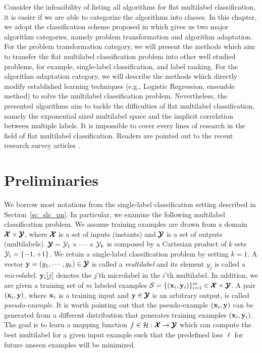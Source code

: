 {Consider the infeasibility of listing all algorithms for flat multilabel classification, it is easier if we are able to categorize the algorithms into classes.
In this chapter, we adopt the classification scheme proposed in \citep{Tsoumakas07multi,Tsoumakas10mining} which gives us two major algorithm categories, namely problem transformation and algorithm adaptation.
For the problem transformation category, we will present the methods which aim to transfer the flat multilabel classification problem into other well studied problems, for example, single-label classification, and label ranking.
For the algorithm adaptation category, we will describe the methods which directly modify established learning techniques (e.g., Logistic Regression, ensemble method) to solve the multilabel classification problem.
Nevertheless, the presented algorithms aim to tackle the difficulties of flat multilabel classification, namely the exponential sized multilabel space and the implicit correlation between multiple labels.
It is impossible to cover every lines of research in the field of flat multilabel classification.
Readers are pointed out to the recent research survey articles \citep{Tsoumakas07multi,Tsoumakas10mining,Zhang14a}.



\section{Preliminaries} \label{sc_mlc_pn}

We borrow most notations from the single-label classification setting described in Section~\ref{sc_slc_pn}.
In particular, we examine the following {multilabel classification} problem.
We assume training examples are drawn from a domain $\pmb {\mathcal{X}}\times\pmb {\mathcal{Y}}$, where $\pmb {\mathcal{X}}$ is a set of inputs (instants) and $\pmb {\mathcal{Y}}$ is a set of outputs (multilabels).
$\pmb {\mathcal{Y}} = \mathcal{Y}_1\times\cdots\times\mathcal{Y}_k$ is composed by a Cartesian product of $k$ sets $\mathcal{Y}_i=\{-1,+1\}$.
We retain a single-label classification problem by setting $k=1$.
A vector $\mathbf {y}=(y_1,\cdots,y_k)\in\pmb {\mathcal{Y}}$ is called a \textit{multilabel} and its element $y_j$ is called a \textit{microlabel}.
$\mathbf {y}_i[j]$ denotes the $j$'th microlabel in the $i$'th multilabel.
In addition, we are given a training set of $m$ labeled examples $\mathcal{S}=\{(\mathbf {x}_i,\mathbf {y}_i)\}_{i=1}^{m}\in\pmb {\mathcal{X}}\times\pmb {\mathcal{Y}}$. 
A pair $(\mathbf {x}_i,\mathbf {y})$, where $\mathbf {x}_i$ is a training input and $\mathbf {y}\in\pmb {\mathcal{Y}}$ is an arbitrary output, is called \textit{pseudo-example}.
It is worth pointing out that the pseudo-example $(\mathbf {x}_i,\mathbf {y})$ can be generated from a different distribution that generates training examples $(\mathbf {x}_i,\mathbf {y}_i)$.
The goal is to learn a mapping function $f\in\mathcal{H}:\pmb {\mathcal{X}}\rightarrow\pmb {\mathcal{Y}}$ which can compute the best multilabel for a given input example such that the predefined loss $\ell$ for future unseen examples will be minimized.



}
